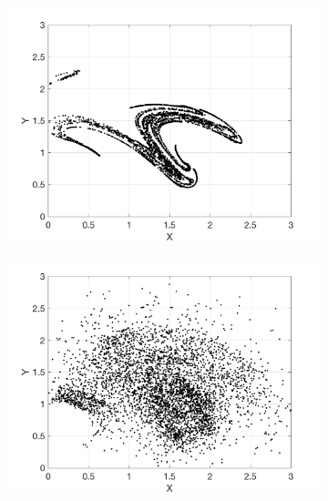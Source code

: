 \documentclass[12pt]{article}
\begin{document}
\begin{figure}[H]
	\centering
	\begin{subfigure}[b]{0.3\textwidth}
		\centering
		\includegraphics[width=\textwidth]{plots/l84l63/poincare_xy_u.png}
	\end{subfigure}
	\hfill
	\begin{subfigure}[b]{0.3\textwidth}
		\centering
		\includegraphics[width=\textwidth]{plots/l84l63/poincare_xy_c.png}
	\end{subfigure}
	\hfill
	\begin{subfigure}[b]{0.3\textwidth}
		\centering

\end{subfigure}
\end{figure}
\end{document}
